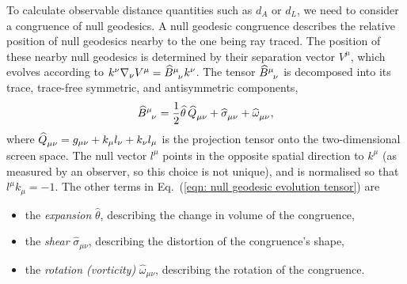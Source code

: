 \documentclass[a4paper,12pt]{report}
\renewcommand{\eqref}[1]{Eq.~({#1})}
\begin{document}
To calculate observable distance quantities such as $d_A$ or $d_L$, we need to consider a congruence of null geodesics. A null geodesic congruence describes the relative position of null geodesics nearby to the one being ray traced. The position of these nearby null geodesics is determined by their separation vector $V^\mu$, which evolves according to $k^\nu \nabla_\nu V^\mu = \widehat{B}\indices{^\mu_\nu} k^\nu$. The tensor $\widehat{B}\indices{^\mu_\nu}$ is decomposed into its trace, trace-free symmetric, and antisymmetric components,
\begin{equation}\label{eqn: null geodesic evolution tensor}
    \widehat{B}\indices{^\mu_\nu} = \frac{1}{2}\widehat{\theta}\,\widehat{Q}\indices{_\mu_\nu} + \widehat{\sigma}\indices{_\mu_\nu} + \widehat{\omega}\indices{_\mu_\nu},
\end{equation}
where $\widehat{Q}\indices{_\mu_\nu} = g_{\mu\nu} + k_\mu l_\nu + k_\nu l_\mu$ is the projection tensor onto the two-dimensional screen space. The null vector $l^\mu$ points in the opposite spatial direction to $k^\mu$ (as measured by an observer, so this choice is not unique), and is normalised so that $l^\mu k_\mu = -1$. The other terms in \eqref{\ref{eqn: null geodesic evolution tensor}} are
\begin{itemize}
  \item the \textit{expansion} $\widehat{\theta}$, describing the change in volume of the congruence,
  \item the \textit{shear} $\widehat{\sigma}_{\mu\nu}$, describing the distortion of the congruence's shape,
  \item the \textit{rotation (vorticity)} $\widehat{\omega}_{\mu\nu}$, describing the rotation of the congruence.
\end{itemize}
\end{document}
